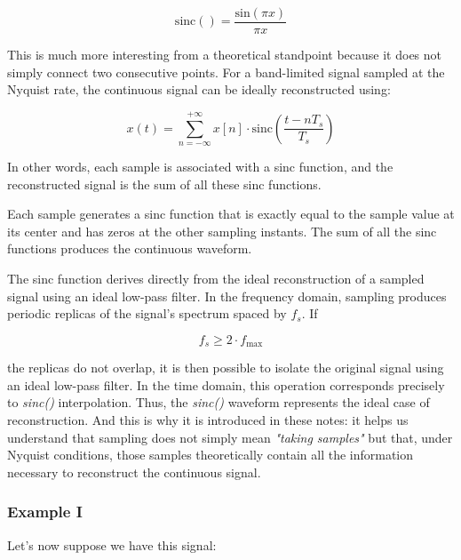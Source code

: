 \documentclass[../main.tex]{subfiles}
\begin{document}
\begin{enumerate}[label=\textbf{-}]
	\begin{equation}
		\mathrm{sinc()} = \frac{\mathrm{sin}(\pi x)}{\pi x}
	\end{equation}

	This is much more interesting from a theoretical standpoint because it does not simply connect two consecutive points.
	For a band-limited signal sampled at the Nyquist rate, the continuous signal can be ideally reconstructed using:
	
	\begin{equation}
		x(t) = \sum_{n=-\infty}^{+\infty} x[n] \cdot \mathrm{sinc}\left( \frac{t - nT_s}{T_s} \right)
	\end{equation}

In other words, each sample is associated with a sinc function, and the reconstructed signal is the sum of all these sinc functions.

	Each sample generates a sinc function that is exactly equal to the sample value at its center and has zeros at the other sampling instants. The sum of all the sinc functions produces the continuous waveform.

	The sinc function derives directly from the ideal reconstruction of a sampled signal using an ideal low-pass filter. In the frequency domain, sampling produces periodic replicas of the signal’s spectrum spaced by $f_s$. If
	
	\begin{equation}
		f_s \geq 2\cdot f_{\mathrm{max}}
	\end{equation}

	the replicas do not overlap, it is then possible to isolate the original signal using an ideal low-pass filter. In the time domain, this operation corresponds precisely to \textit{sinc()} interpolation.
	Thus, the \textit{sinc()} waveform represents the ideal case of reconstruction.
	And this is why it is introduced in these notes: it helps us understand that sampling does not simply mean \textit{"taking samples"} but that, under Nyquist conditions, those samples theoretically contain all the information necessary to reconstruct the continuous signal.
	
\end{enumerate}

\newpage
\subsubsection{Example I}

Let's now suppose we have this signal:
\end{document}
